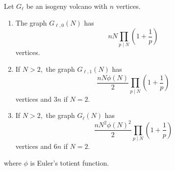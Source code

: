 \documentclass[10pt,a4paper]{amsart}
\begin{document}
\begin{lem}\label{lem:volcano-growth}
  Let $G_{\ell}$ be an isogeny volcano with $n$ vertices.
  \begin{enumerate}[label=(\roman*)]
  \item The graph $G_{\ell,0}(N)$ has
    \[
      n N\prod_{p \mid N}\left( 1 + \frac{1}{p} \right)
    \]
    vertices.
  \item If $N > 2,$ the graph $G_{\ell,1}(N)$ has
    \[
      \frac{nN\phi(N)}{2}\prod_{p \mid N}\left( 1 + \frac{1}{p} \right)
    \]
    vertices and $3n$ if $N = 2$.
  \item If $N > 2,$ the graph $G_{\ell}(N)$ has
    \[
      \frac{nN^2\phi(N)^2}{2} \prod_{p \mid N}\left( 1 + \frac{1}{p} \right)
    \]
    vertices and $6n$ if $N = 2$.
  \end{enumerate}
  where $\phi$ is Euler's totient function.
\end{lem}
\end{document}
